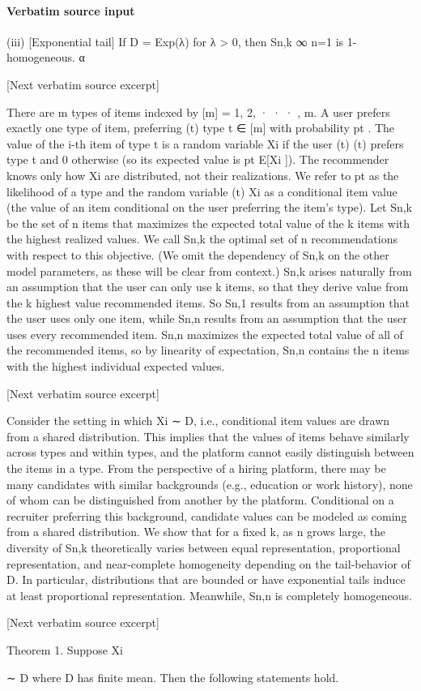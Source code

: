 \documentclass[10pt]{article}
\begin{document}
\paragraph{Verbatim source input}
\begin{ReviewVerbatim}
(iii) [Exponential tail] If D = Exp(λ) for λ > 0, then {Sn,k }∞
n=1 is 1-homogeneous.
α

[Next verbatim source excerpt]

There are m types of items indexed by [m] = {1, 2, · · · , m}. A user prefers exactly one type of item, preferring
(t)
type t ∈ [m] with probability pt . The value of the i-th item of type t is a random variable Xi if the user
(t)
(t)
prefers type t and 0 otherwise (so its expected value is pt E[Xi ]). The recommender knows only how Xi
are distributed, not their realizations. We refer to pt as the likelihood of a type and the random variable
(t)
Xi as a conditional item value (the value of an item conditional on the user preferring the item’s type).
Let Sn,k be the set of n items that maximizes the expected total value of the k items with the highest
realized values. We call Sn,k the optimal set of n recommendations with respect to this objective. (We omit
the dependency of Sn,k on the other model parameters, as these will be clear from context.)
Sn,k arises naturally from an assumption that the user can only use k items, so that they derive value
from the k highest value recommended items. So Sn,1 results from an assumption that the user uses only
one item, while Sn,n results from an assumption that the user uses every recommended item.
Sn,n maximizes the expected total value of all of the recommended items, so by linearity of expectation,
Sn,n contains the n items with the highest individual expected values.

[Next verbatim source excerpt]

Consider the setting in which Xi ∼ D, i.e., conditional item values are drawn from a shared distribution.
This implies that the values of items behave similarly across types and within types, and the platform cannot
easily distinguish between the items in a type. From the perspective of a hiring platform, there may be many
candidates with similar backgrounds (e.g., education or work history), none of whom can be distinguished
from another by the platform. Conditional on a recruiter preferring this background, candidate values can
be modeled as coming from a shared distribution.
We show that for a fixed k, as n grows large, the diversity of Sn,k theoretically varies between equal
representation, proportional representation, and near-complete homogeneity depending on the tail-behavior
of D. In particular, distributions that are bounded or have exponential tails induce at least proportional
representation. Meanwhile, Sn,n is completely homogeneous.

[Next verbatim source excerpt]

Theorem 1. Suppose Xi

∼ D where D has finite mean. Then the following statements hold.
\end{ReviewVerbatim}
\end{document}
